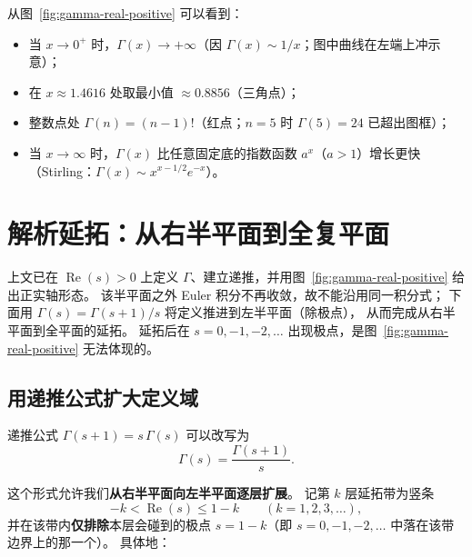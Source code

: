 从图~\ref{fig:gamma-real-positive} 可以看到：
\begin{itemize}
    \item 当 $x \to 0^+$ 时，$\Gamma(x) \to +\infty$（因 $\Gamma(x) \sim 1/x$；图中曲线在左端上冲示意）；
    \item 在 $x \approx 1.4616$ 处取最小值 $\approx 0.8856$（三角点）；
    \item 整数点处 $\Gamma(n) = (n-1)!$（红点；$n=5$ 时 $\Gamma(5)=24$ 已超出图框）；
    \item 当 $x \to \infty$ 时，$\Gamma(x)$ 比任意固定底的指数函数 $a^x$（$a>1$）增长更快
          （Stirling：$\Gamma(x)\sim x^{x-1/2}e^{-x}$）。
\end{itemize}

\section{解析延拓：从右半平面到全复平面}\label{sec:gamma_continuation}

上文已在 $\operatorname{Re}(s)>0$ 上定义 $\Gamma$、建立递推，并用图~\ref{fig:gamma-real-positive} 给出正实轴形态。
该半平面之外 Euler 积分不再收敛，故不能沿用同一积分式；
下面用 $\Gamma(s)=\Gamma(s+1)/s$ 将定义推进到左半平面（除极点），
从而完成从右半平面到全平面的延拓。
延拓后在 $s=0,-1,-2,\ldots$ 出现极点，是图~\ref{fig:gamma-real-positive} 无法体现的。

\subsection{用递推公式扩大定义域}

递推公式 $\Gamma(s+1) = s\,\Gamma(s)$ 可以改写为
\begin{equation}
    \Gamma(s) = \frac{\Gamma(s+1)}{s}.
    \label{eq:recurrence-backward}
\end{equation}

这个形式允许我们\textbf{从右半平面向左半平面逐层扩展}。
记第 $k$ 层延拓带为竖条
\[
  -k < \operatorname{Re}(s) \le 1-k
  \qquad (k=1,2,3,\ldots),
\]
并在该带内\textbf{仅排除}本层会碰到的极点 $s=1-k$（即 $s=0,-1,-2,\ldots$ 中落在该带边界上的那一个）。
具体地：

